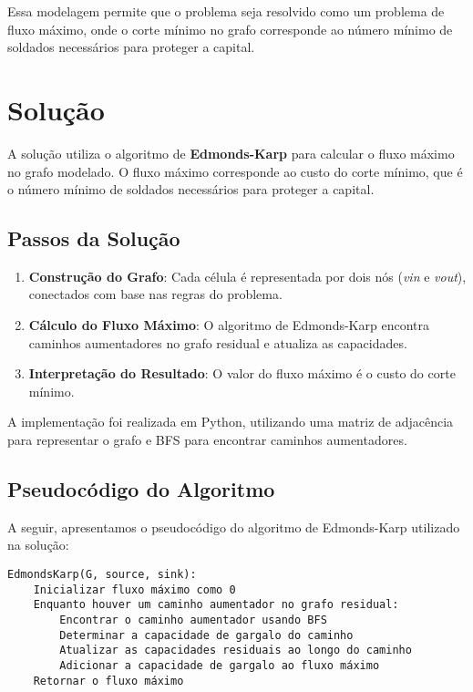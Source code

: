 \documentclass[a4paper,12pt]{article}
\begin{document}
Essa modelagem permite que o problema seja resolvido como um problema de fluxo
máximo, onde o corte mínimo no grafo corresponde ao número mínimo de soldados
necessários para proteger a capital.

\section*{Solução}

A solução utiliza o algoritmo de \textbf{Edmonds-Karp} para calcular o fluxo máximo no grafo modelado. O fluxo máximo corresponde ao custo do corte mínimo, que é o número mínimo de soldados necessários para proteger a capital.

\subsection*{Passos da Solução}

\begin{enumerate}
    \item \textbf{Construção do Grafo}: Cada célula é representada por dois nós (\textit{vin} e \textit{vout}), conectados com base nas regras do problema.
    \item \textbf{Cálculo do Fluxo Máximo}: O algoritmo de Edmonds-Karp encontra caminhos aumentadores no grafo residual e atualiza as capacidades.
    \item \textbf{Interpretação do Resultado}: O valor do fluxo máximo é o custo do corte mínimo.
\end{enumerate}

A implementação foi realizada em Python, utilizando uma matriz de adjacência para representar o grafo e BFS para encontrar caminhos aumentadores.

\subsection*{Pseudocódigo do Algoritmo}

A seguir, apresentamos o pseudocódigo do algoritmo de Edmonds-Karp utilizado na
solução:

\begin{verbatim}
EdmondsKarp(G, source, sink):
    Inicializar fluxo máximo como 0
    Enquanto houver um caminho aumentador no grafo residual:
        Encontrar o caminho aumentador usando BFS
        Determinar a capacidade de gargalo do caminho
        Atualizar as capacidades residuais ao longo do caminho
        Adicionar a capacidade de gargalo ao fluxo máximo
    Retornar o fluxo máximo
\end{verbatim}
\end{document}
